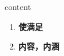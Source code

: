 
\begin{frame}
{\huge content}
\begin{center}
\begin{enumerate}\Large
  \item \textbf{使满足}
  \item \textbf{内容，内涵}
\end{enumerate}
\end{center}
\end{frame}
